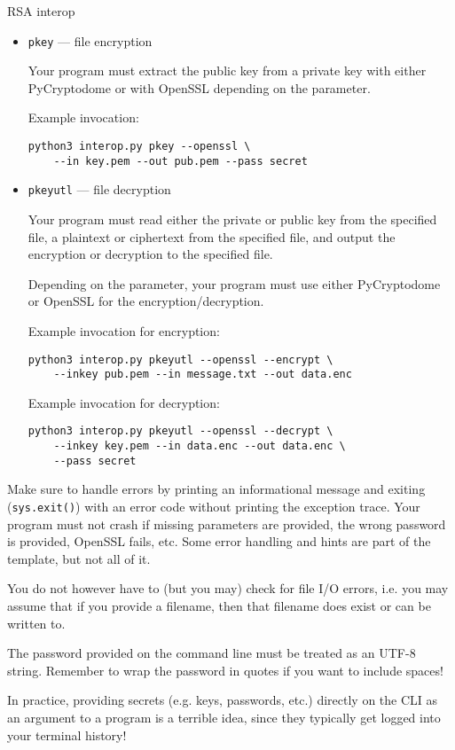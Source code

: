 \documentclass{homework}
\begin{document}
\begin{task}{RSA interop}
\begin{itemize}
    \item \texttt{pkey} --- file encryption
    
    Your program must extract the public key from a private key with either PyCryptodome or with OpenSSL depending on the parameter.

    Example invocation:
    \begin{Verbatim}
python3 interop.py pkey --openssl \
    --in key.pem --out pub.pem --pass secret
    \end{Verbatim}

    \item \texttt{pkeyutl} --- file decryption
    
    Your program must read either the private or public key from the specified file, a plaintext or ciphertext from the specified file, and output the encryption or decryption to the specified file.

    Depending on the parameter, your program must use either PyCryptodome or OpenSSL for the encryption/decryption.

    Example invocation for encryption:
    \begin{Verbatim}
python3 interop.py pkeyutl --openssl --encrypt \
    --inkey pub.pem --in message.txt --out data.enc
    \end{Verbatim}

    Example invocation for decryption:
    \begin{Verbatim}
python3 interop.py pkeyutl --openssl --decrypt \
    --inkey key.pem --in data.enc --out data.enc \
    --pass secret
    \end{Verbatim}
  \end{itemize}

  Make sure to handle errors by printing an informational message and exiting (\texttt{sys.exit()}) with an error code without printing the exception trace.
  Your program must not crash if missing parameters are provided, the wrong password is provided, OpenSSL fails, etc.
  Some error handling and hints are part of the template, but not all of it.

  You do not however have to (but you may) check for file I/O errors, i.e. you may assume that if you provide a filename, then that filename does exist or can be written to.

  The password provided on the command line must be treated as an UTF-8 string.
  Remember to wrap the password in quotes if you want to include spaces!

  \begin{tcolorbox}[title=Note]
    In practice, providing secrets (e.g. keys, passwords, etc.) directly on the CLI as an argument to a program is a terrible idea, since they typically get logged into your terminal history!
  \end{tcolorbox}


\end{task}
\end{document}
